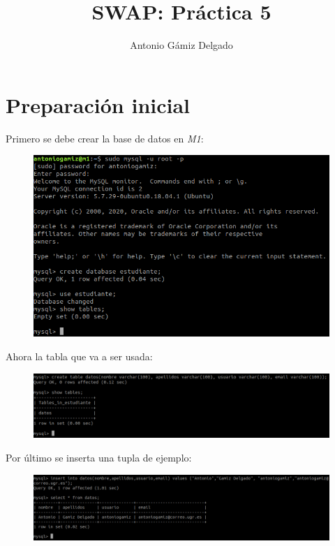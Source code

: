 \documentclass[12pt]{article}
\title{SWAP: Práctica 5}
\author{
        Antonio Gámiz Delgado
}
\begin{document}
\maketitle

\section{Preparación inicial}

Primero se debe crear la base de datos en \textit{M1}:

\begin{figure}[H]
\center
\includegraphics[scale=0.4]{1.png}
\end{figure}

Ahora la tabla que va a ser usada:

\begin{figure}[H]
\center
\includegraphics[scale=0.4]{2.png}
\end{figure}

Por último se inserta una tupla de ejemplo:

\begin{figure}[H]
\center
\includegraphics[scale=0.35]{3.png}
\end{figure}
\end{document}
